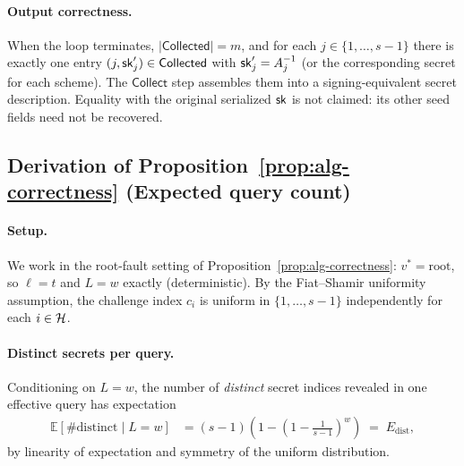 \paragraph{Output correctness.}
When the loop terminates, $|\mathsf{Collected}| = m$, and for each
$j \in \{1,\ldots,s-1\}$ there is exactly one entry $(j, \mathsf{sk}'_j) \in \mathsf{Collected}$
with $\mathsf{sk}'_j = A_j^{-1}$ (or the corresponding secret for each scheme).
The $\mathsf{Collect}$ step assembles them into a signing-equivalent
secret description. Equality with the original serialized $\mathsf{sk}$ is not
claimed: its other seed fields need not be recovered.

\subsection{Derivation of Proposition~\ref{prop:alg-correctness}
  (Expected query count)}
\label{app:proof-query}

\paragraph{Setup.}
We work in the root-fault setting of Proposition~\ref{prop:alg-correctness}:
\(v^* = \mathrm{root}\), so \(\ell = t\) and \(L = w\) exactly (deterministic).
By the Fiat--Shamir uniformity assumption, the challenge index \(c_i\) is
uniform in \(\{1,\ldots,s-1\}\) independently for each \(i \in \mathcal{H}\).

\paragraph{Distinct secrets per query.}
Conditioning on \(L = w\), the number of \emph{distinct} secret indices
revealed in one effective query has expectation
\begin{align}
  \mathbb{E}[\text{\#distinct} \mid L = w]
  &= (s-1)\!\left(1 - \left(1 - \frac{1}{s-1}\right)^{\!w}\right)
  \;=\; E_{\mathrm{dist}},
  \label{eq:edist-exact}
\end{align}
by linearity of expectation and symmetry of the uniform distribution.

